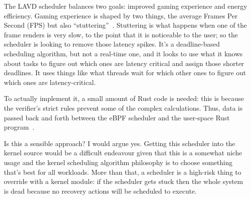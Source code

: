 The LAVD scheduler balances two goals: improved gaming experience and energy efficiency. Gaming experience is shaped by two things, the average Frames Per Second (FPS) but also ``stuttering''~\cite{lavd}. Stuttering is what happens when one of the frame renders is very slow, to the point that it is noticeable to the user; so the scheduler is looking to remove those latency spikes. It's a deadline-based scheduling algorithm, but not a real-time one, and it looks to use what it knows about tasks to figure out which ones are latency critical and assign those shorter deadlines. It uses things like what threads wait for which other ones to figure out which ones are latency-critical.

To actually implement it, a small amount of Rust code is needed: this is because the verifier's strict rules prevent some of the complex calculations. Thus, data is passed back and forth between the eBPF scheduler and the user-space Rust program~\cite{lavd}.

Is this a sensible approach? I would argue yes. Getting this scheduler into the kernel source would be a difficult endeavour given that this is a somewhat niche usage and the kernel scheduling algorithm philosophy is to choose something that's best for all workloads. More than that, a scheduler is a high-risk thing to override with a kernel module: if the scheduler gets stuck then the whole system is dead because no recovery actions will be scheduled to execute.  






